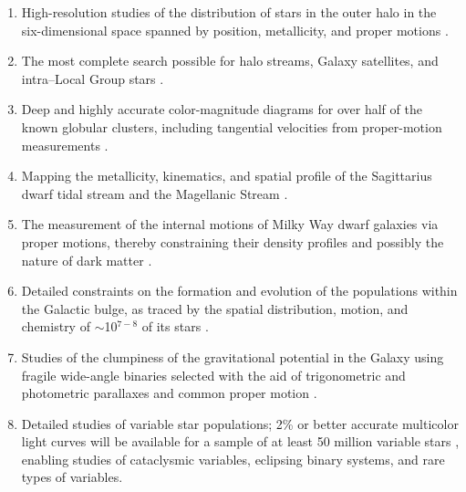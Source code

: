 \begin{enumerate}
\item High-resolution studies of the distribution of stars in the outer halo
          in the six-dimensional space spanned by position, metallicity, and proper
          motions \citep[e.g.,][]{2006AJ....132.1768G,2008ApJ...680..295B,2008ApJ...673..864J,2008ApJ...684..287I,2010ApJ...716....1B}.

\item The most complete search possible for halo streams, Galaxy satellites, and intra--Local Group
          stars \citep[e.g.][]{2007ApJ...654..897B,2009AJ....137..450W,2014AJ....147...76B}.

\item Deep and highly accurate color-magnitude diagrams for over half of the known
          globular clusters, including tangential velocities from proper-motion
          measurements \citep{2007AJ....134..195C,2008ApJS..179..326A}.

\item Mapping the metallicity, kinematics, and spatial profile of the Sagittarius dwarf tidal
          stream \citep[e.g.,][]{2001ApJ...547L.133I,2003ApJ...599.1082M,2005ApJ...619..807L,2014MNRAS.437..116B}
          and the Magellanic Stream \citep{2004AJ....128.1606Z}.

\item The measurement of the internal motions of Milky Way dwarf
          galaxies via proper motions, thereby constraining their density profiles and
	  possibly the nature of dark matter \citep[e.g.,][]{2011ApJ...742...20W}.

\item Detailed constraints on the formation and evolution of the populations within the Galactic bulge, as traced by the spatial
          distribution, motion, and chemistry of $\sim$10$^{7-8}$ of its stars
          \citep[e.g.][]{2011A&A...534A..80H,2014ApJ...787L..19N}.

\item Studies of the clumpiness of the gravitational potential in the Galaxy using
          fragile wide-angle binaries selected with the aid of trigonometric and
          photometric parallaxes and common proper motion \cite[e.g.,][]{2004ApJ...601..311Y,2010A&A...509A..46L}.

\item Detailed studies of variable star populations; 2\% or better accurate
          multicolor light curves will be available for a sample of at least 50
          million variable stars \citep{2007AJ....134.2236S}, enabling studies of
          cataclysmic variables, eclipsing binary systems, and rare types of variables.


\end{enumerate}

